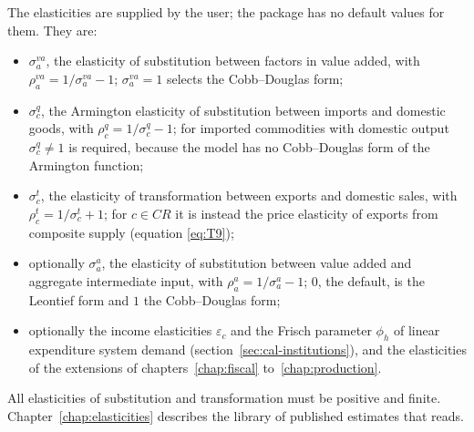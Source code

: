 The elasticities are supplied by the user; the package has no default values
for them. They are:
\begin{itemize}
\item $\sigma^{va}_a$, the elasticity of substitution between factors in value
added, with $\rho^{va}_a = 1/\sigma^{va}_a - 1$; $\sigma^{va}_a = 1$ selects the
Cobb--Douglas form;
\item $\sigma^q_c$, the Armington elasticity of substitution between imports
and domestic goods, with $\rho^q_c = 1/\sigma^q_c - 1$; for imported
commodities with domestic output $\sigma^q_c \ne 1$ is required, because the
model has no Cobb--Douglas form of the Armington function;
\item $\sigma^t_c$, the elasticity of transformation between exports and
domestic sales, with $\rho^t_c = 1/\sigma^t_c + 1$; for $c \in CR$ it is
instead the price elasticity of exports from composite supply (equation
\eqref{eq:T9});
\item optionally $\sigma^a_a$, the elasticity of substitution between value
added and aggregate intermediate input, with $\rho^a_a = 1/\sigma^a_a - 1$;
$0$, the default, is the Leontief form and $1$ the Cobb--Douglas form;
\item optionally the income elasticities $\varepsilon_c$ and the Frisch
parameter $\phi_h$ of linear expenditure system demand
(section~\ref{sec:cal-institutions}), and the elasticities of the extensions
of chapters~\ref{chap:fiscal} to~\ref{chap:production}.
\end{itemize}
All elasticities of substitution and transformation must be positive and
finite. Chapter~\ref{chap:elasticities} describes the library of published
estimates that  reads.
